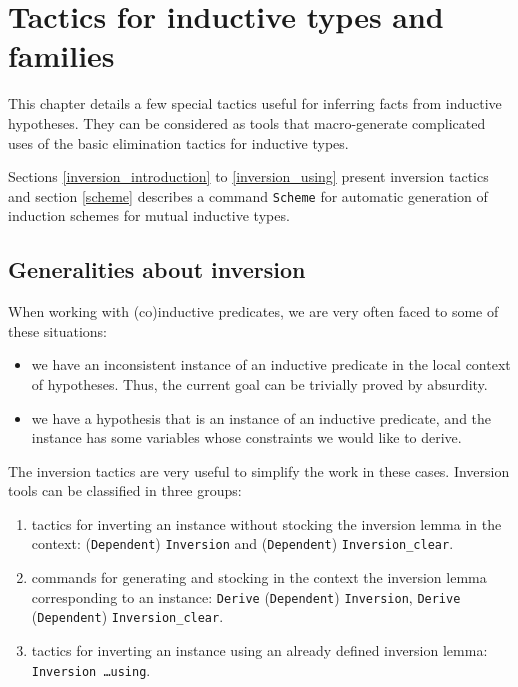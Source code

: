 
%

%

%


\chapter[Tactics for inductive types and families]{Tactics for inductive types and families\label{Addoc-equality}}

This chapter details a few special tactics useful for inferring facts
from inductive hypotheses. They can be considered as tools that
macro-generate complicated uses of the basic elimination tactics for
inductive types. 

Sections \ref{inversion_introduction} to \ref{inversion_using}  present
inversion tactics and section \ref{scheme} describes
a command {\tt Scheme} for automatic generation of induction schemes
for mutual inductive types.

%
%

%

\section[Generalities about inversion]{Generalities about inversion\label{inversion_introduction}}
When working with (co)inductive predicates, we are very often faced to
some of these situations:
\begin{itemize}
\item we have an inconsistent instance of an inductive predicate in the
  local context of hypotheses. Thus, the current goal can be trivially
  proved by absurdity. 

\item we have a hypothesis that is an instance of an inductive
  predicate, and the instance has some variables whose constraints we
  would like to derive.
\end{itemize}

The inversion tactics are very useful to simplify the work in these
cases. Inversion tools can be classified in three groups:
\begin{enumerate}
\item tactics for inverting an instance without stocking the inversion
  lemma in the context: 
  (\texttt{Dependent})  \texttt{Inversion} and
 (\texttt{Dependent}) \texttt{Inversion\_clear}.
\item commands for generating and stocking in the context the inversion
  lemma corresponding to an instance: \texttt{Derive}
  (\texttt{Dependent}) \texttt{Inversion}, \texttt{Derive}
  (\texttt{Dependent}) \texttt{Inversion\_clear}.
\item tactics for inverting an instance using an already defined
  inversion lemma: \texttt{Inversion \ldots using}.
\end{enumerate}

